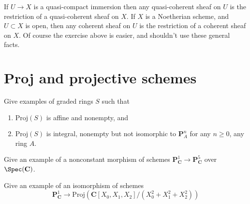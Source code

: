 \begin{remark}
\label{remark-extend-off-open}
If $U \to X$ is a quasi-compact immersion then any
quasi-coherent sheaf on $U$ is the restriction of a
quasi-coherent sheaf on $X$.
If $X$ is a Noetherian scheme, and $U \subset X$ is open,
then any coherent sheaf on $U$ is the restriction of a
coherent sheaf on $X$.
Of course the exercise above is easier, and shouldn't use these general facts.
\end{remark}
















\section{Proj and projective schemes}
\label{section-proj}

\begin{exercise}
\label{exercise-graded-ring-specified-result}
Give examples of graded rings $S$ such that
\begin{enumerate}
\item $\text{Proj}(S)$ is affine and nonempty, and
\item $\text{Proj}(S)$ is integral, nonempty but not isomorphic
to ${\mathbf P}^n_A$ for any $n\geq 0$, any ring $A$.
\end{enumerate}
\end{exercise}

\begin{exercise}
\label{exercise-nonconstant-morphism-proj}
Give an example of a nonconstant morphism
of schemes ${\mathbf P}^1_{\mathbf C} \to {\mathbf P}^5_{\mathbf C}$ over
$\Spec({\mathbf C})$.
\end{exercise}

\begin{exercise}
\label{exercise-isomorphism-P1-conic}
Give an example of an isomorphism of schemes
$$
{\mathbf P}^1_{\mathbf C} \to
\text{Proj}({\mathbf C}[X_0, X_1, X_2]/(X_0^2 + X_1^2 + X_2^2))
$$
\end{exercise}

